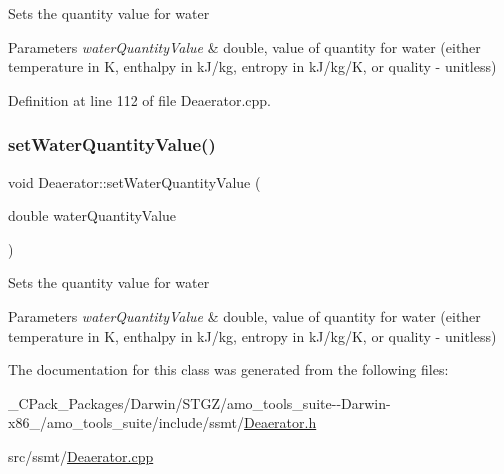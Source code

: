 Sets the quantity value for water 
\begin{DoxyParams}{Parameters}
{\em water\+Quantity\+Value} & double, value of quantity for water (either temperature in K, enthalpy in k\+J/kg, entropy in k\+J/kg/K, or quality -\/ unitless) \\
\hline
\end{DoxyParams}


Definition at line 112 of file Deaerator.\+cpp.

\mbox{\label{class_deaerator_ac31cf2deb8bf30ee6921d1d9f8281eb8}} 
\subsubsection{\texorpdfstring{set\+Water\+Quantity\+Value()}{setWaterQuantityValue()}\hspace{0.1cm}{\footnotesize\ttfamily [3/3]}}
{\footnotesize\ttfamily void Deaerator\+::set\+Water\+Quantity\+Value (\begin{DoxyParamCaption}\item[{double}]{water\+Quantity\+Value }\end{DoxyParamCaption})}

Sets the quantity value for water 
\begin{DoxyParams}{Parameters}
{\em water\+Quantity\+Value} & double, value of quantity for water (either temperature in K, enthalpy in k\+J/kg, entropy in k\+J/kg/K, or quality -\/ unitless) \\
\hline
\end{DoxyParams}


The documentation for this class was generated from the following files\+:\begin{DoxyCompactItemize}
\item 
\+\_\+\+C\+Pack\+\_\+\+Packages/\+Darwin/\+S\+T\+G\+Z/amo\+\_\+tools\+\_\+suite-\/-\/\+Darwin-\/x86\+\_/amo\+\_\+tools\+\_\+suite/include/ssmt/\hyperlink{___c_pack___packages_2_darwin_2_s_t_g_z_2amo__tools__suite--_darwin-x86__64_2amo__tools__suite_2include_2ssmt_2_deaerator_8h}{Deaerator.\+h}\item 
src/ssmt/\hyperlink{_deaerator_8cpp}{Deaerator.\+cpp}\end{DoxyCompactItemize}
